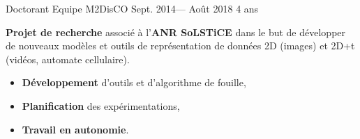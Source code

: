 \jobposition%
{Doctorant}%
{Equipe M2DisCO}
{Sept. 2014--- Août 2018}%
{4 ans}%
{
	\textbf{Projet de recherche} associé à l'\textbf{ANR SoLSTiCE} dans le but de
	développer de nouveaux modèles et outils de représentation de données 2D
	(images) et 2D+t (vidéos, automate cellulaire).

	\begin{itemize}
		\item \textbf{Développement} d’outils et d’algorithme de fouille,
		\item \textbf{Planification} des expérimentations,
		\item \textbf{Travail en autonomie}.
	\end{itemize}

}
